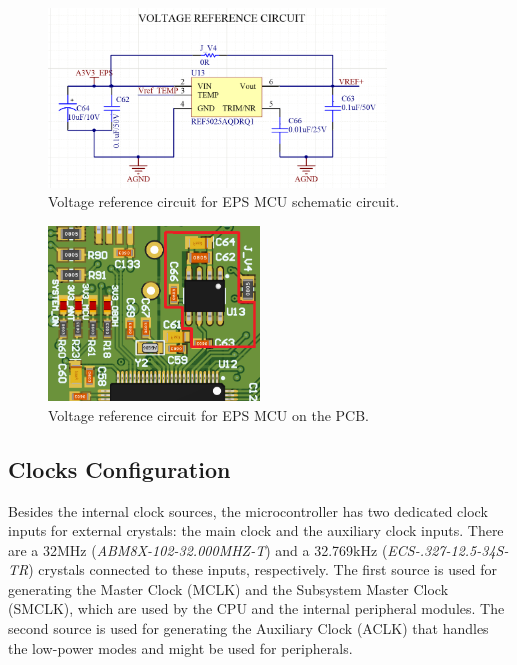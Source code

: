 \begin{figure}[!ht]
    \begin{center}
        \includegraphics[width=0.8\textwidth]{figures/voltage-reference-circuit-schematic.png}
        \caption{Voltage reference circuit for EPS MCU schematic circuit.}
        \label{fig:voltage-reference-circuit-schematic}
    \end{center}
\end{figure}

\begin{figure}[!ht]
    \begin{center}
        \includegraphics[width=0.5\textwidth]{figures/voltage-reference-circuit-3d.png}
        \caption{Voltage reference circuit for EPS MCU on the PCB.}
        \label{fig:voltage-reference-circuit-3d}
    \end{center}
\end{figure}

\subsection{Clocks Configuration}

Besides the internal clock sources, the microcontroller has two dedicated clock inputs for external crystals: the main clock and the auxiliary clock inputs. There are a 32MHz (\textit{ABM8X-102-32.000MHZ-T}) and a 32.769kHz (\textit{ECS-.327-12.5-34S-TR}) crystals connected to these inputs, respectively. The first source is used for generating the Master Clock (MCLK) and the Subsystem Master Clock (SMCLK), which are used by the CPU and the internal peripheral modules. The second source is used for generating the Auxiliary Clock (ACLK) that handles the low-power modes and might be used for peripherals.


